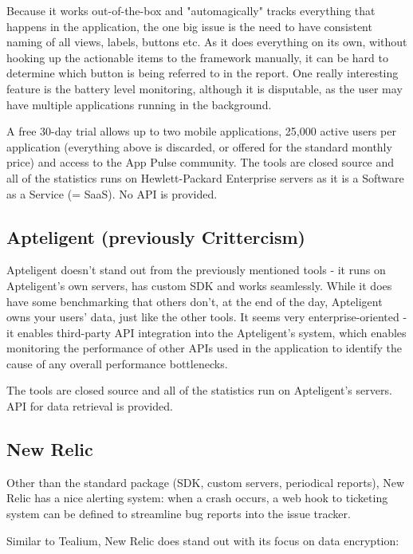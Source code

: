Because it works out-of-the-box and "automagically" tracks everything that happens in the application, the one big issue is the need to have consistent naming of all views, labels, buttons etc. As it does everything on its own, without hooking up the actionable items to the framework manually, it can be hard to determine which button is being referred to in the report. One really interesting feature is the battery level monitoring, although it is disputable, as the user may have multiple applications running in the background.

A free 30-day trial allows up to two mobile applications, 25,000 active users per application (everything above is discarded, or offered for the standard monthly price) and access to the App Pulse community. The tools are closed source and all of the statistics runs on Hewlett-Packard Enterprise servers as it is a Software as a Service (= SaaS). No API is provided.

\subsection{Apteligent (previously Crittercism)}

Apteligent doesn't stand out from the previously mentioned tools - it runs on Apteligent's own servers, has custom SDK and works seamlessly. While it does have some benchmarking that others don't, at the end of the day, Apteligent owns your users' data, just like the other tools. It seems very enterprise-oriented - it enables third-party API integration into the Apteligent's system, which enables monitoring the performance of other APIs used in the application to identify the cause of any overall performance bottlenecks.

The tools are closed source and all of the statistics run on Apteligent's servers. API for data retrieval is provided.

\subsection{New Relic}

Other than the standard package (SDK, custom servers, periodical reports), New Relic has a nice alerting system: when a crash occurs, a web hook to ticketing system can be defined to streamline bug reports into the issue tracker.

Similar to Tealium, New Relic does stand out with its focus on data encryption:

\bigbreak

